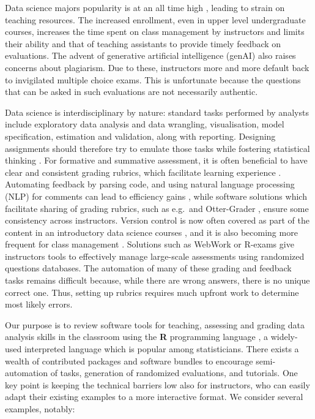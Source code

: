 \documentclass[
  12pt]{article}
\begin{document}
Data science majors popularity is at an all time high
\citep{Pierson:2023}, leading to strain on teaching resources. The
increased enrollment, even in upper level undergraduate courses,
increases the time spent on class management by instructors and limits
their ability and that of teaching assistants to provide timely feedback
on evaluations. The advent of generative artificial intelligence (genAI)
also raises concerns about plagiarism. Due to these, instructors more
and more default back to invigilated multiple choice exams. This is
unfortunate because the questions that can be asked in such evaluations
are not necessarily authentic.

Data science is interdisciplinary by nature: standard tasks performed by
analysts include exploratory data analysis and data wrangling,
visualisation, model specification, estimation and validation, along
with reporting. Designing assignments should therefore try to emulate
those tasks while fostering statistical thinking
\citep{Woodard.Lee.Woodard:2020}. For formative and summative
assessment, it is often beneficial to have clear and consistent grading
rubrics, which facilitate learning experience
\citep{Poulos.Mahony:2008}. Automating feedback by parsing code, and
using natural language processing (NLP) for comments can lead to
efficiency gains \citep{Galassi.Vittorini:2021}, while software
solutions which facilitate sharing of grading rubrics, such as e.g.~and
Otter-Grader \citep{ottergrader:2025}, ensure some consistency across
instructors. Version control is now often covered as part of the content
in an introductory data science courses
\citep[e.g.,][]{Timbers.Campbell.Lee:2022}, and it is also becoming more
frequent for class management \citep{ghclass, Ricci.Medina.Dogucu:2024}.
Solutions such as WebWork \citep{Berkova.Nemec:2020, Zimmerman:2020} or
R-exams \citep{Zeileis.Umlauf.Leisch:2014} give instructors tools to
effectively manage large-scale assessments using randomized questions
databases. The automation of many of these grading and feedback tasks
remains difficult because, while there are wrong answers, there is no
unique correct one. Thus, setting up rubrics requires much upfront work
to determine most likely errors.

Our purpose is to review software tools for teaching, assessing and
grading data analysis skills in the classroom using the \textbf{R}
programming language \citep{Rlang}, a widely-used interpreted language
which is popular among statisticians. There exists a wealth of
contributed packages and software bundles to encourage semi-automation
of tasks, generation of randomized evaluations, and tutorials. One key
point is keeping the technical barriers low also for instructors, who
can easily adapt their existing examples to a more interactive format.
We consider several examples, notably:
\end{document}
